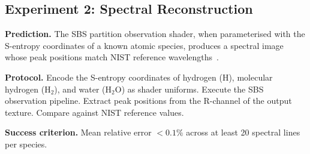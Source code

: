 \documentclass[11pt,twocolumn,a4paper]{article}
\begin{document}
\subsection{Experiment 2: Spectral Reconstruction}

\textbf{Prediction.}  The SBS partition observation shader, when
parameterised with the S-entropy coordinates of a known atomic species,
produces a spectral image whose peak positions match NIST reference
wavelengths~\citep{nist_asd,herzberg1944}.

\textbf{Protocol.}  Encode the S-entropy coordinates of hydrogen (H),
molecular hydrogen (H$_2$), and water (H$_2$O) as shader uniforms.
Execute the SBS observation pipeline.  Extract peak positions from the
R-channel of the output texture.  Compare against NIST reference
values.

\textbf{Success criterion.}  Mean relative error $< 0.1\%$ across at
least 20 spectral lines per species.
\end{document}
